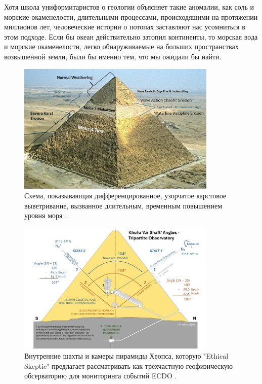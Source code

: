 \documentclass[10pt,twocolumn,letterpaper]{article}
\begin{document}
Хотя школа униформитаристов о геологии объясняет такие аномалии, как соль и морские окаменелости, длительными процессами, происходящими на протяжении миллионов лет, человеческие истории о потопах заставляют нас усомниться в этом подходе. Если бы океан действительно затопил континенты, то морская вода и морские окаменелости, легко обнаруживаемые на больших пространствах возвышенной земли, были бы именно тем, что мы ожидали бы найти.

\begin{figure}[t]
\begin{center}
\includegraphics[width=0.85\textwidth]{khafre.jpg}
\end{center}
   \caption{Схема, показывающая дифференцированное, узорчатое карстовое выветривание, вызванное длительным, временным повышением уровня моря \cite{27}.}
\label{fig:4}
\end{figure}

\begin{figure}[t]
\begin{center}
\includegraphics[width=0.85\textwidth]{shafts.jpg}
\end{center}
   \caption{Внутренние шахты и камеры пирамиды Хеопса, которую "Ethical Skeptic" предлагает рассматривать как трёхчастную геофизическую обсерваторию для мониторинга событий ECDO \cite{28}.}
\label{fig:5}
\end{figure}
\end{document}
